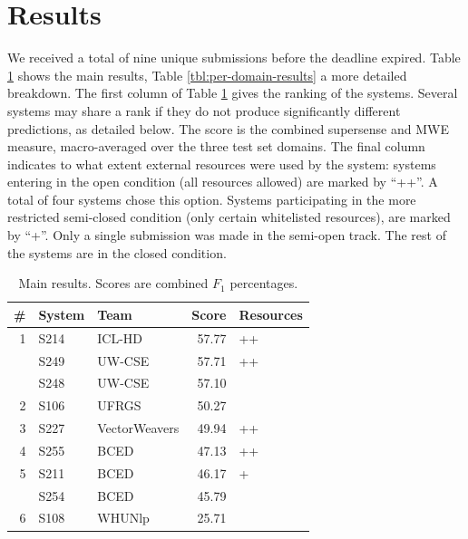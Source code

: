 \documentclass[11pt,letterpaper]{article}
\begin{document}
\section{Results}\label{sec:results}

We received a total of nine unique submissions before the deadline expired. 
Table \ref{tbl:main-results} shows the main results, Table \ref{tbl:per-domain-results} a more detailed breakdown. The first column of Table \ref{tbl:main-results} gives the ranking of the systems. Several systems may share a rank if they do not produce significantly different predictions, as detailed below. The score is the combined supersense and MWE measure, macro-averaged over the three test set domains. The final column indicates to what extent external resources were used by the system: systems entering in the open condition (all resources allowed) are marked by ``++''. A total of four systems chose this option. Systems participating in the more restricted semi-closed condition (only certain whitelisted resources), are marked by ``+''. Only a single submission was made in the semi-open track. The rest of the systems are in the closed condition. 

\begin{table}\small\centering
\begin{tabular}{rllrl}
 \#   & \textbf{System} &           \textbf{Team} &  \textbf{Score}  & \textbf{Resources} \\
\midrule
    1 &   S214 &         ICL-HD &  57.77 &   ++ \\
      &   S249 &         UW-CSE &  57.71 &   ++ \\
      &   S248 &         UW-CSE &  57.10 &      \\
    2 &   S106 &          UFRGS &  50.27 &      \\
    3 &   S227 &  VectorWeavers &  49.94 &   ++ \\
    4 &   S255 &           BCED &  47.13 &   ++ \\
    5 &   S211 &           BCED &  46.17 &    + \\
      &   S254 &           BCED &  45.79 &      \\
    6 &   S108 &         WHUNlp &  25.71 &      \\
\end{tabular}

\caption{Main results. Scores are combined $F_1$ percentages.}

\label{tbl:main-results}
	
\end{table}
\end{document}
